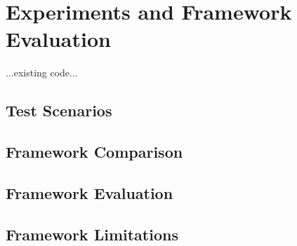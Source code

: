
\chapter{Experiments and Framework Evaluation\label{chap:experiments_evaluation}}

...existing code...

\section{Test Scenarios}


\section{Framework Comparison}


\section{Framework Evaluation}


\section{Framework Limitations}

